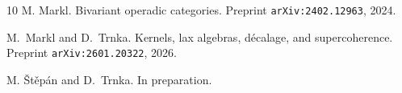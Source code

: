 \documentclass[12pt,leqno]{amsart}
\theoremstyle{definition}
\newcommand{\4}{\texttt{4}}
\begin{document}
\begin{thebibliography}{10}
M. Markl.
\newblock Bivariant operadic categories.
\newblock Preprint {\tt arXiv:2402.12963}, 2024.

M.~Markl and D.~Trnka.
\newblock Kernels, lax algebras, d\'ecalage, and supercoherence.
\newblock Preprint {\tt arXiv:2601.20322}, 2026.




M. \v St\v ep\'an and D.~Trnka.
\newblock In preparation.

\end{thebibliography}
\end{document}
